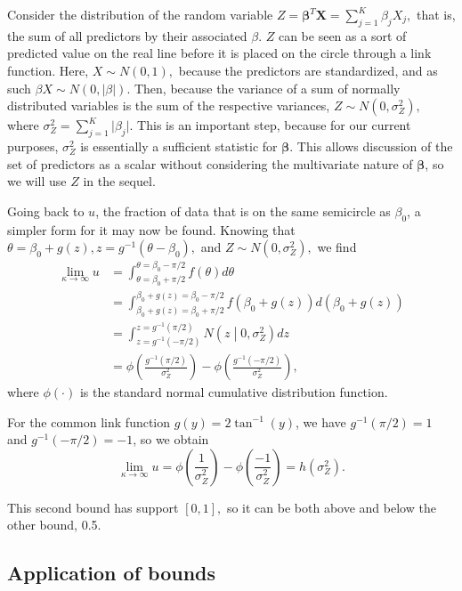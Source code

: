 \documentclass[12pt,a4paper]{article}\usepackage[]{graphicx}\usepackage[]{color}
\begin{document}
Consider the distribution of the random variable $Z = \boldsymbol\beta^T \boldsymbol{X} = \sum_{j=1}^{K} \beta_j X_j,$ that is, the sum of all predictors by their associated $\beta$. $Z$ can be seen as a sort of predicted value on the real line before it is placed on the circle through a link function. Here, $X \sim N(0, 1),$ because the predictors are standardized, and as such $\beta X \sim N(0, \vert \beta \vert)$. Then, because the variance of a sum of normally distributed variables is the sum of the respective variances, $Z \sim N(0, \sigma^2_Z),$ where $\sigma^2_Z = \sum_{j=1}^{K} \vert \beta_j \vert.$ This is an important step, because for our current purposes, $\sigma^2_Z$ is essentially a sufficient statistic for $\boldsymbol\beta.$ This allows discussion of the set of predictors as a scalar without considering the multivariate nature of $\boldsymbol\beta$, so we will use $Z$ in the sequel.

Going back to $u$, the fraction of data that is on the same semicircle as $\beta_0$, a simpler form for it may now be found. Knowing that $\theta = \beta_0 + g (z), z = g^{-1}(\theta - \beta_0),$ and $Z \sim N \left(0, \sigma^2_Z \right),$ we find
\begin{align}
\lim_{\kappa\to\infty} u & = \int_{\theta = \beta_0 + \pi / 2}^{\theta = \beta_0 - \pi / 2} f(\theta) d \theta \\
& = \int_{\beta_0 + g (z) = \beta_0 + \pi / 2}^{\beta_0 + g (z) = \beta_0 - \pi / 2} f(\beta_0 + g (z)) d (\beta_0 + g (z)) \\
& =  \int_{z = g^{-1} ( - \pi / 2 )}^{z = g^{-1} (\pi / 2) } N \left( z \middle\vert 0, \sigma^2_Z \right) dz \\
& = \phi \left( \frac{g^{-1} (\pi / 2)}{\sigma^2_Z} \right) - \phi \left( \frac{g^{-1} (- \pi / 2)}{\sigma^2_Z} \right),
\end{align}
where $\phi( \cdot )$ is the standard normal cumulative distribution function.

For the common link function $g(y) = 2  \tan^{-1} (y)$, we have $g^{-1}(\pi/2) = 1$ and $g^{-1}(-\pi/2) = -1$, so we obtain
\begin{equation}
\lim_{\kappa\to\infty} u  =  \phi \left( \frac{1}{\sigma^2_Z} \right) - \phi \left( \frac{-1}{\sigma^2_Z} \right) = h\left(\sigma^2_Z \right).
\end{equation}

This second bound has support $[0, 1],$ so it can be both above and below the other bound, 0.5.

\subsection{Application of bounds}
\end{document}
